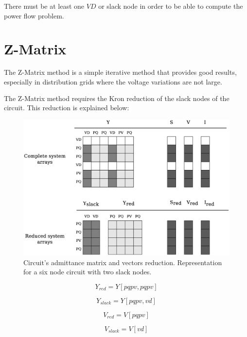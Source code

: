 \documentclass[a4paper,twoside,fleqn]{tufte-book}
\begin{document}
There must be at least one $VD$ or slack node in order to be able to compute the power flow problem. 




\section{Z-Matrix}

The Z-Matrix method is a simple iterative method that provides good results, especially in distribution grids where the voltage variations are not large.

The Z-Matrix method requires the Kron reduction of the slack nodes of the circuit. This reduction is explained below:

\begin{figure}[h!]
  \includegraphics[width=\linewidth]{img/Matrix_reduction.eps}
  \caption{Circuit's admittance matrix and vectors reduction. Representation for a six node circuit with two slack nodes.}
  \label{fig:reduction}
\end{figure}

\begin{equation}
Y_{red} = Y[pqpv, pqpv]
\end{equation}

\begin{equation}
Y_{slack} = Y[pqpv, vd]
\end{equation}

\begin{equation}
V_{red} = V[pqpv]
\end{equation}

\begin{equation}
V_{slack} = V[vd]
\end{equation}
\end{document}
